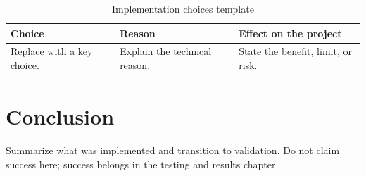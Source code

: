 \begin{table}[H]
    \centering
    \caption{Implementation choices template}
    \label{tab:implementation-choices-template}
    \small
    \begin{tabular}{L{0.24\textwidth}L{0.30\textwidth}L{0.30\textwidth}}
        \toprule
        \textbf{Choice} & \textbf{Reason} & \textbf{Effect on the project} \\
        \midrule
        Replace with a key choice. & Explain the technical reason. & State the benefit, limit, or risk. \\
        \bottomrule
    \end{tabular}
\end{table}

\section{Conclusion}
Summarize what was implemented and transition to validation. Do not claim success here; success belongs in the testing and results chapter.